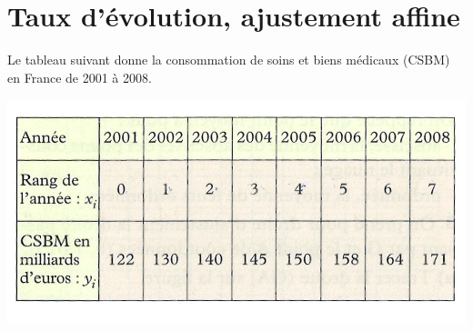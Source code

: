 \section{Taux d'évolution, ajustement affine}

Le tableau suivant donne la consommation de soins et biens médicaux (CSBM) en France de 2001 à 2008.

\begin{center}
	\includegraphics[scale=1.2]{csbm}
\end{center}


